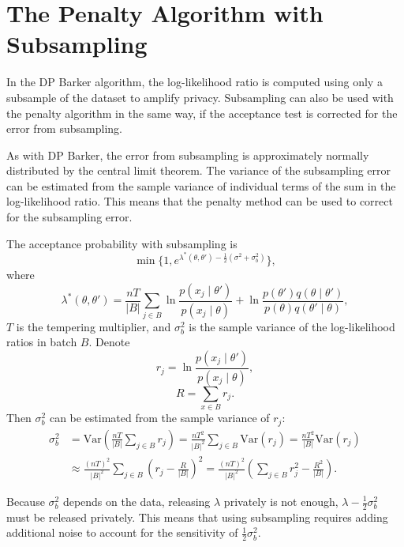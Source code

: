 \documentclass[english,twoside,openright]{HYgraduMLDS}
\newcommand{\var}{\mathrm{Var}}
\begin{document}
\section{The Penalty Algorithm with Subsampling}\label{dp_minibatch_penalty_section}

In the DP Barker algorithm, the log-likelihood ratio is computed using only
a subsample of the dataset to amplify privacy. Subsampling can also be used 
with the penalty algorithm in the same way, if the acceptance test is 
corrected for the error from subsampling.

As with DP Barker, the error from subsampling is approximately normally 
distributed by the central limit theorem. The variance of the subsampling 
error can be estimated from the sample variance of individual terms of the 
sum in the log-likelihood ratio. This means that the penalty method can be used
to correct for the subsampling error.

The acceptance probability with subsampling is
\[
    \min\{1, e^{\lambda^*(\theta, \theta') - \frac{1}{2}(\sigma^2 + \sigma_b^2)}\},
\]
where
\[
    \lambda^*(\theta, \theta') = \frac{nT}{|B|}\sum_{j\in B}
    \ln \frac{p(x_j\mid \theta')}{p(x_j \mid \theta)}
    + \ln \frac{p(\theta')q(\theta \mid \theta')}{p(\theta)q(\theta' \mid \theta)},
\]
\(T\) is the tempering multiplier,
and \(\sigma_b^2\) is the sample variance of the log-likelihood ratios in
batch \(B\). Denote
\[
    r_j = \ln \frac{p(x_j\mid \theta')}{p(x_j\mid \theta)},
\]
\[
    R = \sum_{x\in B}r_j.
\]
Then \(\sigma^2_b\) can be estimated from the sample variance of \(r_j\):
\begin{align*}
    \sigma_b^2 
    &= \var\left(\frac{nT}{|B|}\sum_{j\in B}r_j\right)
    = \frac{nT^2}{|B|^2}\sum_{j\in B}\var(r_j)
    = \frac{nT^2}{|B|}\var(r_j)
  \\&\approx\frac{(nT)^2}{|B|^2}
    \sum_{j\in B}\left(r_j - \frac{R}{|B|}\right)^2
    = \frac{(nT)^2}{|B|^2}\left(\sum_{j\in B}r_j^2 - \frac{R^2}{|B|}\right).
\end{align*}

Because \(\sigma_b^2\) depends on the data, releasing \(\lambda\) privately is 
not enough, \(\lambda - \frac{1}{2}\sigma_b^2\) must be released privately.
This means that using subsampling requires adding additional noise to account 
for the sensitivity of \(\frac{1}{2}\sigma_b^2\).
\end{document}
